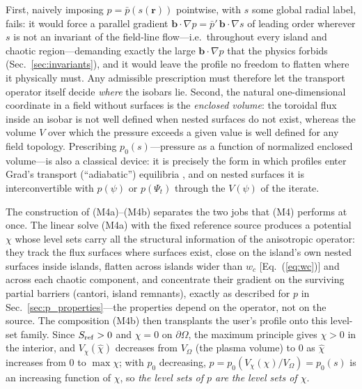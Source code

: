 \documentclass[english]{article}
\newcommand{\bb}{\mathbf{b}}
\newcommand{\br}{\mathbf{r}}
\begin{document}
First, naively imposing $p=\bar p(s(\br))$ pointwise, with $s$ some global radial label, fails: it
would force a parallel gradient $\bb\cdot\nabla p=\bar p'\,\bb\cdot\nabla s$ of leading order
wherever $s$ is not an invariant of the field-line flow---i.e.\ throughout every island and chaotic
region---demanding exactly the large $\bb\cdot\nabla p$ that the physics forbids
(Sec.~\ref{sec:invariants}), and it would leave the profile no freedom to flatten where it
physically must. Any admissible prescription must therefore let the transport operator itself
decide \emph{where} the isobars lie. Second, the natural one-dimensional coordinate in a field
without surfaces is the \emph{enclosed volume}: the toroidal flux inside an isobar is not well
defined when nested surfaces do not exist, whereas the volume $V$ over which the pressure exceeds a
given value is well defined for any field topology. Prescribing $p_0(s)$---pressure as a function
of normalized enclosed volume---is also a classical device: it is precisely the form in which profiles enter
Grad's transport (``adiabatic'') equilibria \cite{grad1975}, and on nested surfaces it is
interconvertible with $p(\psi)$ or $p(\Psi_t)$ through the $V(\psi)$ of the iterate.

The construction of (M4a)--(M4b) separates the two jobs that (M4) performs at once. The linear
solve (M4a) with the fixed reference source produces a potential $\chi$ whose level sets carry all
the structural information of the anisotropic operator: they track the flux surfaces where surfaces
exist, close on the island's own nested surfaces inside islands, flatten across islands wider than
$w_c$ [Eq.~(\ref{eq:wc})] and across each chaotic component, and concentrate their gradient on the
surviving partial barriers (cantori, island remnants), exactly as described for $p$ in
Sec.~\ref{sec:p_properties}---the properties depend on the operator, not on the source. The
composition (M4b) then transplants the user's profile onto this level-set family. Since $S_{\rm
ref}>0$ and $\chi=0$ on $\partial\Omega$, the maximum principle gives $\chi>0$ in the interior, and
$V_\chi(\hat\chi)$ decreases from $V_\Omega$ (the plasma volume) to $0$ as $\hat\chi$ increases
from $0$ to $\max\chi$; with $p_0$ decreasing,
$p=p_0(V_\chi(\chi)/V_\Omega)=p_0(s)$ is an increasing function of
$\chi$, so \emph{the level sets of $p$ are the level sets of $\chi$}.
\end{document}
